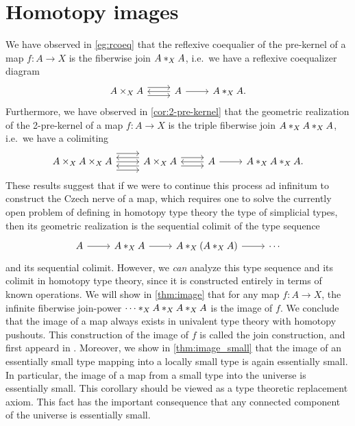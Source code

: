 \chapter{Homotopy images}

We have observed in \cref{eg:rcoeq} that the reflexive coequalier of the pre-kernel of a map $f:A\to X$ is the fiberwise join $\join[X]{A}{A}$, i.e.~we have a reflexive coequalizer diagram
\begin{equation*}
\begin{tikzcd}
A\times_X A \arrow[r,yshift=1ex] \arrow[r,yshift=-1ex] & A \arrow[l] \arrow[r] & \join[X]{A}{A}.
\end{tikzcd}
\end{equation*}
Furthermore, we have observed in \cref{cor:2-pre-kernel} that the geometric realization of the 2-pre-kernel of a map $f:A\to X$ is the triple fiberwise join $\join[X]{A}{\join[X]{A}{A}}$, i.e.~we have a colimiting 
\begin{equation*}
\begin{tikzcd}
A\times_{X} A \times_{X} A \arrow[r,yshift=2ex] \arrow[r] \arrow[r,yshift=-2ex] & A \times_X A \arrow[l,yshift=1ex] \arrow[l,yshift=-1ex] \arrow[r,yshift=1ex] \arrow[r,yshift=-1ex] & A \arrow[l] \arrow[r] & \join[X]{A}{\join[X]{A}{A}}.
\end{tikzcd}
\end{equation*}
These results suggest that if we were to continue this process ad infinitum to construct the Czech nerve of a map, which requires one to solve the currently open problem of defining in homotopy type theory the type of simplicial types, then its geometric realization is the sequential colimit of the type sequence
\begin{equation*}
\begin{tikzcd}
A \arrow[r] & \join[X]{A}{A} \arrow[r] & \join[X]{A}{(\join[X]{A}{A})} \arrow[r] & \cdots
\end{tikzcd}
\end{equation*}
and its sequential colimit. However, we \emph{can} analyze this type sequence and its colimit in homotopy type theory, since it is constructed entirely in terms of known operations. We will show in \cref{thm:image} that for any map $f:A\to X$, the infinite fiberwise join-power $\join[X]{\cdots}{\join[X]{A}{\join[X]{A}{A}}}$ is the image of $f$. We conclude that the image of a map always exists in univalent type theory with homotopy pushouts. This construction of the image of $f$ is called the join construction, and first appeard in \cite{joinconstruction}. Moreover, we show in \cref{thm:image_small} that the image of an essentially small type mapping into a locally small type is again essentially small. In particular, the image of a map from a small type into the universe is essentially small. This corollary should be viewed as a type theoretic replacement axiom. This fact has the important consequence that any connected component of the universe is essentially small.

